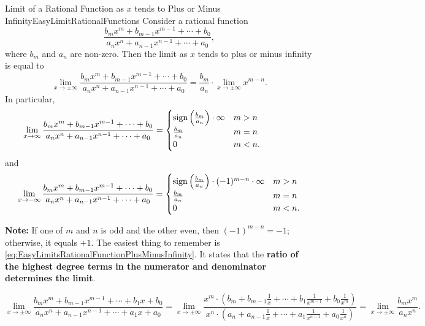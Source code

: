 \bigskip

\begin{propColor}{Limit of a Rational Function as $x$ tends to Plus or Minus Infinity}{EasyLimitRationalFunctions}
Consider a rational function 
$$\frac{b_m x^m + b_{m-1} x^{m-1} +  \cdots + b_0}{a_n x^n + a_{n-1} x^{n-1} +  \cdots + a_0},$$
where $b_m$ and $a_n$ are non-zero. Then the limit as $x$ tends to plus or minus infinity is equal to
\begin{equation}
\label{eq:EasyLimitsRationalFunctionPlusMinusInfinity}
 \lim_{x \to \pm \infty}  \frac{b_m x^m + b_{m-1} x^{m-1} +  \cdots + b_0}{a_n x^n + a_{n-1} x^{n-1} +  \cdots + a_0} =  \frac{b_m }{a_n} \cdot  \lim_{x \to \pm \infty}   x^{m-n}.
\end{equation}
In particular, 
\begin{equation}
\label{eq:EasyLimitsRationalFunctionPlusInfinity}
    \lim_{x \to \infty}  \frac{b_m x^m + b_{m-1} x^{m-1} +  \cdots + b_0}{a_n x^n + a_{n-1} x^{n-1} +  \cdots + a_0} = \begin{cases}
        \mathrm{sign}\left( \frac{b_m }{a_n}  \right) \cdot \infty & m > n \hspace*{1.5cm}\\
        \frac{b_m }{a_n} & m = n\\
        0 & m < n.
    \end{cases}
\end{equation}
and
\begin{equation}
\label{eq:EasyLimitsRationalFunctionMinusInfinity}
    \lim_{x \to -\infty}  \frac{b_m x^m + b_{m-1} x^{m-1} +  \cdots + b_0}{a_n x^n + a_{n-1} x^{n-1} +  \cdots + a_0} = \begin{cases}
        \mathrm{sign}\left( \frac{b_m }{a_n} \right) \cdot (-1)^{m-n} \cdot \infty & m > n\\
        \frac{b_m }{a_n} & m = n\\
        0 & m < n.
    \end{cases}
\end{equation}

\textbf{Note:} If one of $m$ and $n$ is odd and the other even, then $(-1)^{m-n}=-1$; otherwise, it equals $+1$. The easiest thing to remember is \eqref{eq:EasyLimitsRationalFunctionPlusMinusInfinity}. It states that the \textbf{ratio of the highest degree terms in the numerator and denominator determines the limit}. 

$$\boxed{ \lim_{x \to \pm \infty}  \frac{b_m x^m + b_{m-1} x^{m-1} +  \cdots+ b_1 x + b_0}{a_n x^n + a_{n-1} x^{n-1} +  \cdots+ a_1 x + a_0} = 
\lim_{x \to \pm \infty}  \frac{ x^m \cdot (b_m + b_{m-1} \frac{1}{x} +  \cdots +  b_1 \frac{1}{x^{m-1}} + b_0 \frac{1}{x^m})}{ x^n \cdot (a_n + a_{n-1} \frac{1}{x} +  \cdots+  a_1 \frac{1}{x^{n-1}} + a_0 \frac{1}{x^n} )} = \lim_{x \to \pm \infty}  \frac{b_m x^m }{a_n x^n}.} $$
    
\end{propColor}

